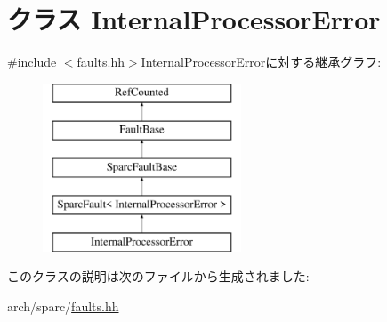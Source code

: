 \hypertarget{classSparcISA_1_1InternalProcessorError}{
\section{クラス InternalProcessorError}
\label{classSparcISA_1_1InternalProcessorError}
}


{\ttfamily \#include $<$faults.hh$>$}InternalProcessorErrorに対する継承グラフ:\begin{figure}[H]
\begin{center}
\leavevmode
\includegraphics[height=5cm]{classSparcISA_1_1InternalProcessorError}
\end{center}
\end{figure}


このクラスの説明は次のファイルから生成されました:\begin{DoxyCompactItemize}
\item 
arch/sparc/\hyperlink{arch_2sparc_2faults_8hh}{faults.hh}\end{DoxyCompactItemize}
